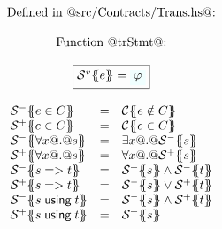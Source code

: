\begin{figure}\small
\setlength{\arraycolsep}{2pt}
\[\begin{array}{c}
\mbox{Defined in @src/Contracts/Trans.hs@:} \\ \\
\mbox{Function @trStmt@:} \\ \\
\ruleform{\trs{v}{e} = \formula{\phi}} \\ \\
\begin{array}{lcl}
  \trs{-}{e \in C}         & = & \trc{e \notin C} \\
  \trs{+}{e \in C}         & = & \trc{e \in C} \\
  \trs{-}{\forall x @.@ s} & = & \exists x @.@ \trs{-}{s} \\
  \trs{+}{\forall x @.@ s} & = & \forall x @.@ \trs{+}{s} \\
  \trs{-}{s => t}          & = & \trs{+}{s} \land \trs{-}{t} \\
  \trs{+}{s => t}          & = & \trs{-}{s} \lor \trs{+}{t} \\
  \trs{-}{s \; \textsf{using} \; t} & = & \trs{-}{s} \land \trs{+}{t} \\
  \trs{+}{s \; \textsf{using} \; t} & = & \trs{+}{s} \\
\end{array} \\ \\


\end{array}\]
\end{figure}
